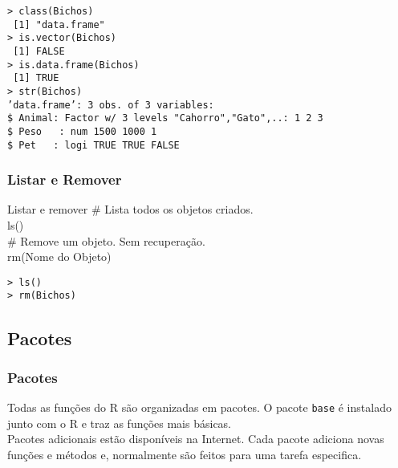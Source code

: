 \documentclass{beamer}
\begin{document}
  \begin{frame}

\texttt{\small > class(Bichos)\\
~[1] "data.frame"\\
> is.vector(Bichos) \\
~[1] FALSE \\
> is.data.frame(Bichos)\\
~[1] TRUE \\
\vspace{10pt}
> str(Bichos)\\
'data.frame':	3 obs. of  3 variables: \\
\$ Animal: Factor w/ 3 levels "Cahorro","Gato",..: 1 2 3\\
\$ Peso ~ : num  1500 1000 1\\
\$ Pet ~  : logi  TRUE TRUE FALSE}
  \end{frame}
  \begin{frame}
    \frametitle{Listar e Remover}
    \begin{block}{Listar e remover}
     \# Lista todos os objetos criados. \\ 
     ls()\\
      \# Remove um objeto. Sem recuperação. \\
      rm(Nome do Objeto)
    \end{block}
   \texttt{> ls()\\
           > rm(Bichos)
}
  \end{frame}
\subsection{Pacotes}
  \begin{frame}
    \frametitle{Pacotes}
    Todas as funções do R são organizadas em pacotes. O pacote \texttt{base} é instalado junto com o R e traz as funções mais básicas.\\
    \vspace{10pt}
 Pacotes adicionais estão disponíveis na Internet. Cada pacote adiciona novas funções e métodos e, normalmente são feitos para uma tarefa especifica.\\
   
  \end{frame}
\end{document}
